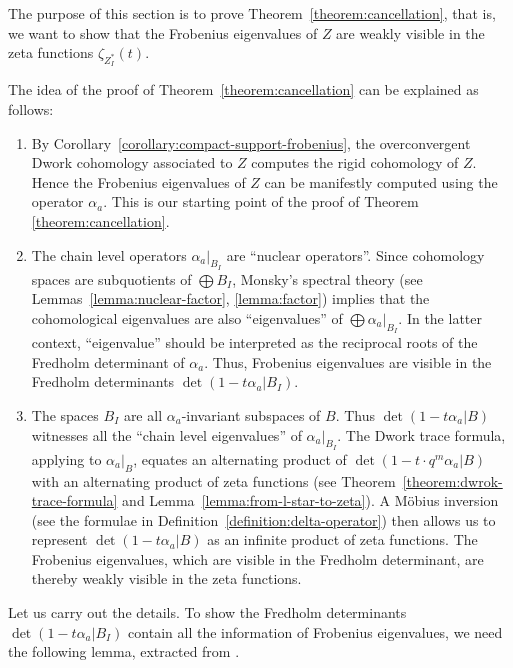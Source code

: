 \documentclass{amsart}
\numberwithin{equation}{section}
\theoremstyle{plain}
\theoremstyle{definition}
\begin{document}
The purpose of this section is to prove Theorem~\ref{theorem:cancellation}, that
is, we want to show that the Frobenius eigenvalues of \(Z\) are weakly visible
in the zeta functions \(\zeta_{Z_I^{\ast}}(t)\).

The idea of the proof of Theorem~\ref{theorem:cancellation} can be
explained as follows:
\begin{enumerate}[wide]
\item By Corollary~\ref{corollary:compact-support-frobenius}, the overconvergent Dwork
cohomology associated to \(Z\) computes the rigid cohomology of \(Z\).
Hence the Frobenius eigenvalues of \(Z\) can be manifestly computed
using the operator \(\alpha_{a}\).  This is our starting point of the proof
of Theorem \ref{theorem:cancellation}.

\item The chain level operators \(\alpha_{a}|_{B_I}\) are
``nuclear operators''.
Since cohomology spaces are subquotients of \(\bigoplus B_{I}\),
Monsky's spectral theory (see Lemmas~\ref{lemma:nuclear-factor},
\ref{lemma:factor}) implies that the cohomological eigenvalues
are also ``eigenvalues'' of \(\bigoplus\alpha_{a}|_{B_I}\).
In the latter context, ``eigenvalue'' should be interpreted as the
reciprocal roots of the Fredholm determinant of \(\alpha_{a}\).  Thus,
Frobenius eigenvalues are visible in the Fredholm determinants
\(\det(1-t\alpha_{a}| B_I)\).
\item The spaces \(B_{I}\) are all \(\alpha_{a}\)-invariant subspaces of \(B\).
Thus \(\det(1-t\alpha_{a}| B)\) witnesses
all the ``chain level eigenvalues'' of \(\alpha_{a}|_{B_I}\).  The
Dwork trace formula, applying to \(\alpha_{a}|_B\), equates an alternating
product of \(\det(1-t\cdot q^{m}\alpha_{a}| B)\) with an alternating
product of zeta functions (see
Theorem~\ref{theorem:dwrok-trace-formula} and
Lemma~\ref{lemma:from-l-star-to-zeta}).  A M\"obius inversion (see the
formulae in Definition~\ref{definition:delta-operator}) then allows us
to represent \(\det(1-t\alpha_{a}| B)\) as an infinite product of zeta
functions. The Frobenius eigenvalues, which are visible in the
Fredholm determinant, are thereby weakly visible in the zeta
functions.
\end{enumerate}

Let us carry out the details.
To show the Fredholm determinants \(\det(1-t\alpha_{a} | B_I)\) contain all the
information of Frobenius eigenvalues, we need the following lemma,
extracted from \cite[Theorem~1.4]{monsky:formal-cohomology-3}.
\end{document}
